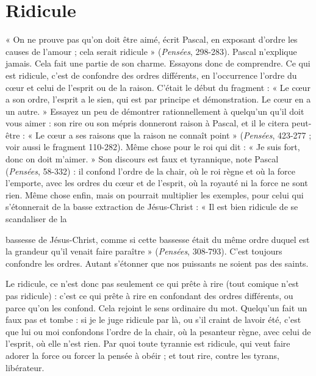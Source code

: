 \section{Ridicule}
« On ne prouve pas qu’on doit être aimé, écrit Pascal, en exposant
d’ordre les causes de l’amour ; cela serait ridicule » ({\it Pensées},
298-283). Pascal n’explique jamais. Cela fait une partie de son charme.
Essayons donc de comprendre. Ce qui est ridicule, c’est de confondre des
ordres différents, en l’occurrence l’ordre du cœur et celui de l'esprit ou de la
raison. C'était le début du fragment : « Le cœur a son ordre, l'esprit a le sien,
qui est par principe et démonstration. Le cœur en a un autre. » Essayez un peu
de démontrer rationnellement à quelqu'un qu’il doit vous aimer : son rire ou
son mépris donneront raison à Pascal, et il le citera peut-être : « Le cœur a ses
raisons que la raison ne connaît point » ({\it Pensées}, 423-277 ; voir aussi le fragment
110-282). Même chose pour le roi qui dit : « Je suis fort, donc on doit
m'aimer. » Son discours est faux et tyrannique, note Pascal ({\it Pensées}, 58-332) :
il confond l’ordre de la chair, où le roi règne et où la force l'emporte, avec les
ordres du cœur et de l’esprit, où la royauté ni la force ne sont rien. Même chose
enfin, mais on pourrait multiplier les exemples, pour celui qui s’étonnerait de
la basse extraction de Jésus-Christ : « Il est bien ridicule de se scandaliser de la

bassesse de Jésus-Christ, comme si cette bassesse était du même ordre duquel
est la grandeur qu’il venait faire paraître » ({\it Pensées}, 308-793). C'est toujours
confondre les ordres. Autant s'étonner que nos puissants ne soient pas des
saints.

Le ridicule, ce n’est donc pas seulement ce qui prête à rire (tout comique
n’est pas ridicule) : c’est ce qui prête à rire en confondant des ordres différents,
ou parce qu’on les confond. Cela rejoint le sens ordinaire du mot. Quelqu'un
fait un faux pas et tombe : si je le juge ridicule par là, ou s’il craint de lavoir
été, c’est que lui ou moi confondons l’ordre de la chair, où la pesanteur règne,
avec celui de l’esprit, où elle n’est rien. Par quoi toute tyrannie est ridicule, qui
veut faire adorer la force ou forcer la pensée à obéir ; et tout rire, contre les
tyrans, libérateur.

